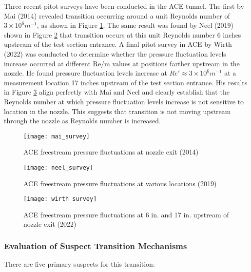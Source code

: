 Three recent pitot surveys have been conducted in the ACE tunnel. The first by Mai (2014) revealed transition occurring around a unit Reynolds number of $3 \times 10^6 m^{-1}$, as shown in Figure \ref{fig:mai_survey}. The same result was found by Neel (2019) shown in Figure \ref{fig:neel_survey} that transition occurs at this unit Reynolds number 6 inches upstream of the test section entrance. A final pitot survey in ACE by Wirth (2022) was conducted to determine whether the pressure fluctuation levels increase occurred at different Re/m values at positions farther upstream in the nozzle. He found pressure fluctuation levels increase at $Re' \approx 3 \times 10^6 m^{-1}$ at a measurement location 17 inches upstream of the test section entrance. His results in Figure \ref{fig:wirth_survey} align perfectly with Mai and Neel and clearly establish that the Reynolds number at which pressure fluctuation levels increase is not sensitive to location in the nozzle. This suggests that transition is not moving upstream through the nozzle as Reynolds number is increased.

\begin{figure}[ht]
    \centering
    \texttt{[image: mai\_survey]}
    \caption[ACE freestream pressure fluctuations at nozzle exit (2014)]{ACE freestream pressure fluctuations at nozzle exit (2014) \cite{mai_dis}}
    \label{fig:mai_survey}
\end{figure}

\begin{figure}[ht]
    \centering
    \texttt{[image: neel\_survey]}
    \caption[ACE freestream pressure fluctuations at various locations (2019)]{ACE freestream pressure fluctuations at various locations (2019) \cite{neel_dis}}
    \label{fig:neel_survey}
\end{figure}

\begin{figure}[ht]
    \centering
    \texttt{[image: wirth\_survey]}
    \caption{ACE freestream pressure fluctuations at 6 in. and 17 in. upstream of nozzle exit (2022)}
    \label{fig:wirth_survey}
\end{figure}

\subsubsection{Evaluation of Suspect Transition Mechanisms}

There are five primary suspects for this transition:

